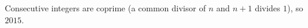 Consecutive integers are coprime (a common divisor of $n$ and $n+1$ divides $1$), so $\boxed{2015}$.

